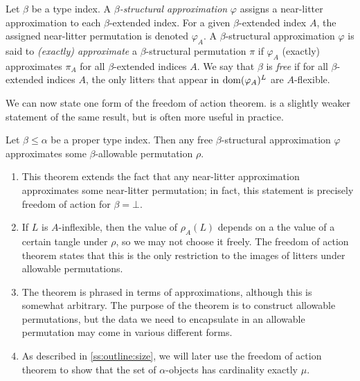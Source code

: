\begin{definition}
    Let \( \beta \) be a type index.
    A \emph{\( \beta \)-structural approximation} \( \varphi \) assigns a near-litter approximation to each \( \beta \)-extended index.
    For a given \( \beta \)-extended index \( A \), the assigned near-litter permutation is denoted \( \varphi_A \).
    A \( \beta \)-structural approximation \( \varphi \) is said to \emph{(exactly) approximate} a \( \beta \)-structural permutation \( \pi \) if \( \varphi_A \) (exactly) approximates \( \pi_A \) for all \( \beta \)-extended indices \( A \).
    We say that \( \beta \) is \emph{free} if for all \( \beta \)-extended indices \( A \), the only litters that appear in \( \operatorname{dom} (\varphi_A)^L \) are \( A \)-flexible.
\end{definition}

We can now state one form of the freedom of action theorem.
 is a slightly weaker statement of the same result, but is often more useful in practice.

\begin{theorem}
    \label{thm:foa}
    Let \( \beta \leq \alpha \) be a proper type index.
    Then any free \( \beta \)-structural approximation \( \varphi \) approximates some \( \beta \)-allowable permutation \( \rho \).
\end{theorem}

\begin{remarks}\mbox{\negthinspace}
    \begin{enumerate}
        \item This theorem extends the fact that any near-litter approximation approximates some near-litter permutation; in fact, this statement is precisely freedom of action for \( \beta = \bot \).
        \item If \( L \) is \( A \)-inflexible, then the value of \( \rho_A(L) \) depends on a the value of a certain tangle under \( \rho \), so we may not choose it freely.
        The freedom of action theorem states that this is the only restriction to the images of litters under allowable permutations.
        \item The theorem is phrased in terms of approximations, although this is somewhat arbitrary.
        The purpose of the theorem is to construct allowable permutations, but the data we need to encapsulate in an allowable permutation may come in various different forms.
        \item As described in \cref{ss:outline:size}, we will later use the freedom of action theorem to show that the set of \( \alpha \)-objects has cardinality exactly \( \mu \).
    \end{enumerate}
\end{remarks}

